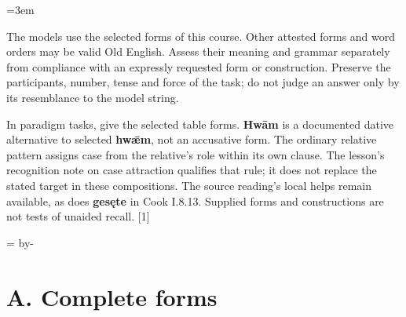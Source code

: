 \newcommand{\runningtitle}{Unit 8. Answer key}

\emergencystretch=3em
\newcommand{\itempara}[2]{\par\addvspace{3pt}\noindent\hangindent=1.8em\hangafter=1\makebox[1.8em][l]{#1.}#2\par}
\newcommand{\reserve}[1]{\par\penalty-100\begingroup\dimen0=\pagegoal\advance\dimen0 by-\pagetotal\ifdim\dimen0<#1\newpage\fi\endgroup}

\raggedright
{}

The models use the selected forms of this course. Other attested forms and word orders may be valid Old English. Assess their meaning and grammar separately from compliance with an expressly requested form or construction. Preserve the participants, number, tense and force of the task; do not judge an answer only by its resemblance to the model string.

In paradigm tasks, give the selected table forms. \textbf{Hwām} is a documented dative alternative to selected \textbf{hwǣm}, not an accusative form. The ordinary relative pattern assigns case from the relative's role within its own clause. The lesson's recognition note on case attraction qualifies that rule; it does not replace the stated target in these compositions. The source reading's local helps remain available, as does \textbf{gesęte} in Cook I.8.13. Supplied forms and constructions are not tests of unaided recall. [1]

\reserve{7\baselineskip}
\section*{A. Complete forms}

